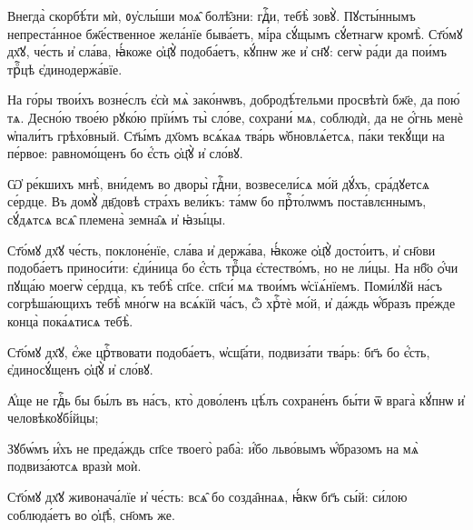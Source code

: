 
\label{step} 

\hKv Внегда̀ скорбѣ́ти мѝ, ᲂу҆слы́ши моѧ̑ болѣ̑зни: гдⷭ҇и,  тебѣ̀ зовꙋ̀. 
%
\hKv Пꙋсты́ннымъ непреста́нное бж҃е́ственное жела́нїе быва́етъ,  мі́ра сꙋ́щымъ сꙋ́етнагѡ кромѣ̀.  
%
 Ст҃о́мꙋ дх҃ꙋ, че́сть и҆ сла́ва, ꙗ҆́коже ѻ҆ц҃ꙋ̀  подоба́етъ, кꙋ́пнѡ же и҆ сн҃ꙋ: сегѡ̀ ра́ди да пои́мъ трⷪ҇цѣ  є҆динодержа́вїе.  
%

\hKv На го́ры твои́хъ возне́слъ є҆сѝ мѧ̀ зако́нѡвъ,  добродѣ́тельми просвѣтѝ бж҃е, да пою́ тѧ.  
%
\hKv Десно́ю твое́ю рꙋко́ю прїи́мъ ты̀ сло́ве, сохрани́ мѧ,  соблюдѝ, да не ѻ҆́гнь менѐ ѡ҆пали́тъ грѣхо́вный. 
%
\hKv Ст҃ы́мъ дх҃омъ всѧ́каѧ тва́рь ѡ҆бновлѧ́етсѧ, па́ки  текꙋ́щи на пе́рвое: равномо́щенъ бо є҆́сть ѻ҆ц҃ꙋ̀ и҆  сло́вꙋ. 
%

\hKv Ѡ҆ ре́кшихъ мнѣ̀, вни́демъ во дворы̀ гдⷭ҇ни, возвесели́сѧ  мо́й дꙋ́хъ, сра́дꙋетсѧ се́рдце.  
%
\hKv Въ домꙋ̀ дв҃довѣ стра́хъ вели́къ: та́мѡ бо прⷭ҇то́лѡмъ  поста́влєннымъ, сꙋ́дѧтсѧ всѧ̑ племена̀ земна̑ѧ и҆ ꙗ҆зы́цы. 
%

\hKv Ст҃о́мꙋ дх҃ꙋ че́сть, поклоне́нїе, сла́ва и҆  держа́ва, ꙗ҆́коже ѻ҆ц҃ꙋ̀ досто́итъ, и҆ сн҃ови подоба́етъ  приноси́ти: є҆ди́ница бо є҆́сть трⷪ҇ца є҆стество́мъ, но  не ли́цы.  
%
%
\hKv На нб҃о ѻ҆́чи пꙋща́ю моегѡ̀ се́рдца, къ тебѣ̀ сп҃се.  сп҃си́ мѧ твои́мъ ѡ҆сїѧ́нїемъ. 
%
\hKv Поми́лꙋй на́съ согрѣша́ющихъ тебѣ̀ мно́гѡ на всѧ́кїй  ча́съ, ѽ хрⷭ҇тѐ мо́й, и҆ да́ждь ѡ҆́бразъ пре́жде конца̀  пока́ѧтисѧ тебѣ̀. 
%

\hKv Ст҃о́мꙋ дх҃ꙋ, є҆́же црⷭ҇твовати подоба́етъ,  ѡ҆сщ҃а́ти, подвиза́ти тва́рь: бг҃ъ бо є҆́сть,  є҆диносꙋ́щенъ ѻ҆ц҃ꙋ̀ и҆ сло́вꙋ. 
%

\hKv А҆́ще не гдⷭ҇ь бы бы́лъ въ на́съ, кто̀ дово́ленъ цѣ́лъ  сохране́нъ бы́ти ѿ врага̀ кꙋ́пнѡ и҆ человѣкоꙋбі́йцы; 

\hKv Зꙋбѡ́мъ и҆́хъ не преда́ждь сп҃се твоего̀ раба̀: и҆́бо  льво́вымъ ѡ҆́бразомъ на мѧ̀ подвиза́ютсѧ вразѝ моѝ.  
%

\hKv Ст҃о́мꙋ дх҃ꙋ живонача́лїе и҆ че́сть: всѧ̑ бо  созда̑ннаѧ, ꙗ҆́кѡ бг҃ъ сы́й: си́лою соблюда́етъ во  ѻ҆ц҃ѣ̀, сн҃омъ же. 
%

